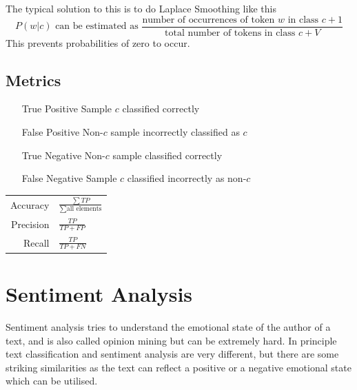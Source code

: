 \documentclass[11pt]{article}
\begin{document}
The typical solution to this is to do Laplace Smoothing like this
\begin{equation*}
	P(w|c)\text{ can be estimated as }\frac{\text{number of occurrences of token $w$ in class } c + 1}{\text{total number of tokens in class } c+V}
\end{equation*}
This prevents probabilities of zero to occur.

\subsection{Metrics}
\begin{itemize}[leftmargin=*, labelindent=3cm, labelsep=1cm]
	\item[True Positive] Sample $c$ classified correctly
	\item[False Positive] Non-$c$ sample incorrectly classified as $c$
	\item[True Negative] Non-$c$ sample classified correctly
	\item[False Negative] Sample $c$ classified incorrectly as non-$c$
\end{itemize}

\begin{tabularx}{\linewidth}{rX}
	Accuracy & $ \frac{\sum TP}{\sum \text{all elements}} $ \\
	Precision & $\frac{TP}{TP + FP}$\\
	Recall & $ \frac{TP}{TP + FN} $\\
\end{tabularx}

\section{Sentiment Analysis}
Sentiment analysis tries to understand the emotional state of the author of a text, and is also called opinion mining but can be extremely hard. In principle text classification and sentiment analysis are very different, but there are some striking similarities as the text can reflect a positive or a negative emotional state which can be utilised.
\end{document}
